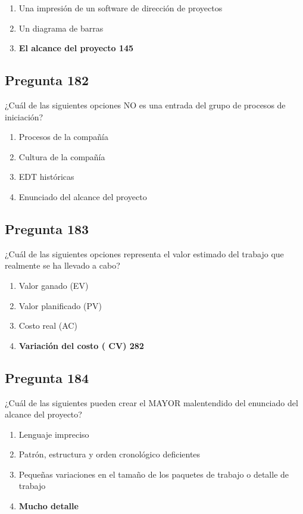 \documentclass[11pt,a4paper]{article}
\begin{document}
\begin{enumerate}[label=\alph*)]
  \item Una impresión de un software de dirección de proyectos
  \item Un diagrama de barras
  \item \textbf{El alcance del proyecto 145}
\end{enumerate}

\subsection*{Pregunta 182}
¿Cuál de las siguientes opciones NO es una entrada del grupo de procesos de iniciación?

\begin{enumerate}[label=\alph*)]
  \item Procesos de la compañía
  \item Cultura de la compañía
  \item EDT históricas
  \item Enunciado del alcance del proyecto
\end{enumerate}

\subsection*{Pregunta 183}
¿Cuál de las siguientes opciones representa el valor estimado del trabajo que realmente se ha llevado a cabo?

\begin{enumerate}[label=\alph*)]
  \item Valor ganado (EV)
  \item Valor planificado (PV)
  \item Costo real (AC)
  \item \textbf{Variación del costo ( CV) 282}
\end{enumerate}

\subsection*{Pregunta 184}
¿Cuál de las siguientes pueden crear el MAYOR malentendido del enunciado del alcance del proyecto?

\begin{enumerate}[label=\alph*)]
  \item Lenguaje impreciso
  \item Patrón, estructura y orden cronológico deficientes
  \item Pequeñas variaciones en el tamaño de los paquetes de trabajo o detalle de trabajo
  \item \textbf{Mucho detalle}
\end{enumerate}
\end{document}
